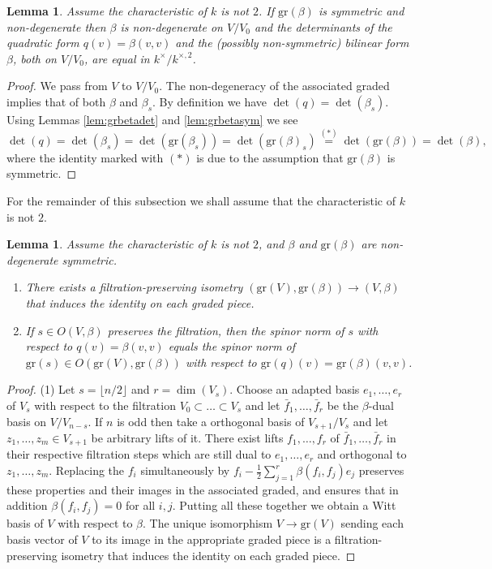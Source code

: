 \documentclass{article}
\def\tx#1{\textrm{#1}}
\newtheorem{lem}[thm]{Lemma}
\theoremstyle{definition}
\numberwithin{equation}{subsection}
\renewcommand{\-}{\hyp{}}
\begin{document}
\begin{appendices}
\begin{lem} \label{lem:q-u-s} Assume the characteristic of $k$ is not $2$. If $\mathrm{gr}(\beta)$ is symmetric and non-degenerate then $\beta$ is non-degenerate on $V/V_0$ and the determinants of the quadratic form $q(v)=\beta(v,v)$ and the (possibly non-symmetric) bilinear form $\beta$, both on $V/V_0$, are equal in $k^\times/k^{\times,2}$.
\end{lem}
\begin{proof}
	We pass from $V$ to $V/V_0$. The non-degeneracy of the associated graded implies that of both $\beta$ and $\beta_s$. By definition we have $\det(q)=\det(\beta_s)$. Using Lemmas \ref{lem:grbetadet} and \ref{lem:grbetasym} we see
	\[ \det(q)=\det(\beta_s)=\det(\tx{gr}(\beta_s))=\det(\tx{gr}(\beta)_s) \stackrel{(*)}{=}\det(\tx{gr}(\beta))=\det(\beta), \]
	where the identity marked with $(*)$ is due to the assumption that $\tx{gr}(\beta)$ is symmetric.
\end{proof}

For the remainder of this subsection we shall assume that the characteristic of $k$ is not $2$. 

\begin{lem} \label{lem:graded-spinor}
	Assume the characteristic of $k$ is not $2$, and $\beta$ and $\mathrm{gr}(\beta)$ are non-degenerate symmetric. 
	\begin{enumerate}
		\item There exists a filtration-preserving isometry $(\mathrm{gr}(V),\mathrm{gr}(\beta)) \to (V,\beta)$ that induces the identity on each graded piece.
		\item If $s \in O(V,\beta)$ preserves the filtration, then the spinor norm of $s$ with respect to $q(v)=\beta(v,v)$ equals the spinor norm of $\mathrm{gr}(s) \in O(\mathrm{gr}(V),\mathrm{gr}(\beta))$ with respect to $\mathrm{gr}(q)(v) = \mathrm{gr}(\beta)(v,v)$.
	\end{enumerate}
\end{lem}
\begin{proof}
	(1) Let $s=\lfloor n/2\rfloor$ and $r=\dim(V_s)$. Choose an adapted basis $e_1,\dots,e_r$ of $V_s$ with respect to the filtration $V_0 \subset \dots \subset V_s$ and let $\bar f_1,\dots,\bar f_r$ be the $\beta$-dual basis on $V/V_{n-s}$. If $n$ is odd then take a orthogonal basis of $V_{s+1}/V_s$ and let $z_1,\dots,z_m \in V_{s+1}$ be arbitrary lifts of it. There exist lifts $f_1,\dots,f_r$ of $\bar f_1,\dots,\bar f_r$ in their respective filtration steps which are still dual to $e_1,\dots,e_r$ and orthogonal to $z_1,\dots,z_m$. Replacing the $f_i$ simultaneously by $f_i-\tfrac{1}{2}\sum_{j=1}^r\beta(f_i,f_j)e_j$
	preserves these properties and their images in the associated graded, and ensures that in addition $\beta(f_i,f_j)=0$ for all $i,j$. Putting all these together we obtain a Witt basis of $V$ with respect to $\beta$. The unique isomorphism $V \to \mathrm{gr}(V)$ sending each basis vector of $V$ to its image in the appropriate graded piece is a filtration-preserving isometry that induces the identity on each graded piece.



\end{proof}
\end{appendices}
\end{document}
